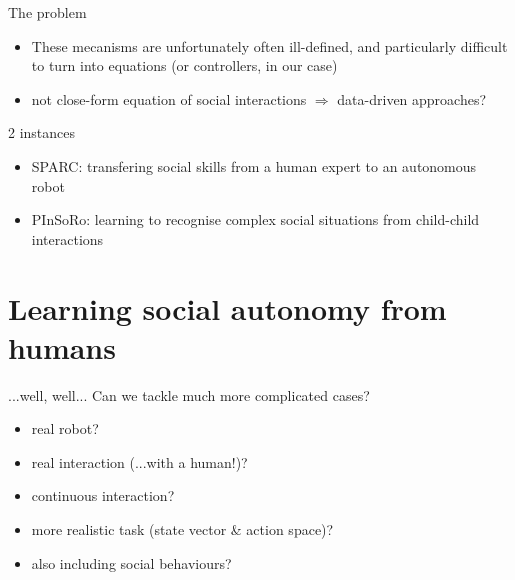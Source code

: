 \documentclass[compress]{beamer}
\begin{document}
\begin{frame}{The problem}
    \begin{itemize}
        \item These mecanisms are unfortunately often ill-defined, and
            particularly difficult to turn into equations (or controllers, in
            our case)
        \item not close-form equation of social interactions $\Rightarrow$ data-driven approaches?
    \end{itemize}
\end{frame}

\begin{frame}{2 instances}

    \begin{itemize}
        \item SPARC: transfering social skills from a human expert to an autonomous robot
        \item PInSoRo: learning to recognise complex social situations from
            child-child interactions
    \end{itemize}

\end{frame}

\section[Learning social behaviours]{Learning social autonomy from humans}

{
\begin{frame}[plain]
\end{frame}
}


\begin{frame}{...well, well...}
    Can we tackle much more complicated cases?
    \begin{itemize}
        \item<+-> real robot?
        \item<+-> real interaction (...with a human!)?
        \item<+-> continuous interaction?
        \item<+-> more realistic task (state vector \& action space)?
        \item<+-> also including social behaviours?
    \end{itemize}

\end{frame}
\end{document}
